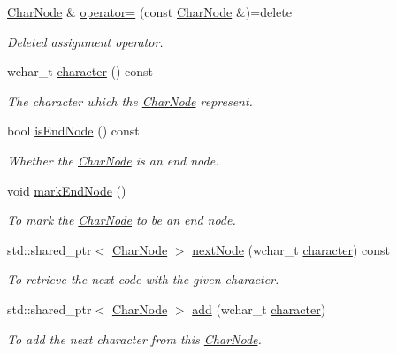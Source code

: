 \begin{DoxyCompactItemize}
\mbox{\label{classlakoo_1_1_char_node_a2eca4617401905a26a2fee4f2ea6541b}} 
\hyperlink{classlakoo_1_1_char_node}{Char\+Node} \& \hyperlink{classlakoo_1_1_char_node_a2eca4617401905a26a2fee4f2ea6541b}{operator=} (const \hyperlink{classlakoo_1_1_char_node}{Char\+Node} \&)=delete
\begin{DoxyCompactList}\small\item\em Deleted assignment operator. \end{DoxyCompactList}\item 
wchar\+\_\+t \hyperlink{classlakoo_1_1_char_node_ae84c27b0f90851d228cbb3b7c4243022}{character} () const
\begin{DoxyCompactList}\small\item\em The character which the \hyperlink{classlakoo_1_1_char_node}{Char\+Node} represent. \end{DoxyCompactList}\item 
bool \hyperlink{classlakoo_1_1_char_node_ae49687d0eaca8fb554b43b7a044c9b8b}{is\+End\+Node} () const
\begin{DoxyCompactList}\small\item\em Whether the \hyperlink{classlakoo_1_1_char_node}{Char\+Node} is an end node. \end{DoxyCompactList}\item 
void \hyperlink{classlakoo_1_1_char_node_a55da784911560cd110dc600e615ac410}{mark\+End\+Node} ()
\begin{DoxyCompactList}\small\item\em To mark the \hyperlink{classlakoo_1_1_char_node}{Char\+Node} to be an end node. \end{DoxyCompactList}\item 
std\+::shared\+\_\+ptr$<$ \hyperlink{classlakoo_1_1_char_node}{Char\+Node} $>$ \hyperlink{classlakoo_1_1_char_node_ab73f4abe7136075ce7b96907d54465c6}{next\+Node} (wchar\+\_\+t \hyperlink{classlakoo_1_1_char_node_ae84c27b0f90851d228cbb3b7c4243022}{character}) const
\begin{DoxyCompactList}\small\item\em To retrieve the next code with the given character. \end{DoxyCompactList}\item 
std\+::shared\+\_\+ptr$<$ \hyperlink{classlakoo_1_1_char_node}{Char\+Node} $>$ \hyperlink{classlakoo_1_1_char_node_aad471a4681970e4bc098209c56b95137}{add} (wchar\+\_\+t \hyperlink{classlakoo_1_1_char_node_ae84c27b0f90851d228cbb3b7c4243022}{character})
\begin{DoxyCompactList}\small\item\em To add the next character from this \hyperlink{classlakoo_1_1_char_node}{Char\+Node}. \end{DoxyCompactList}\end{DoxyCompactItemize}


